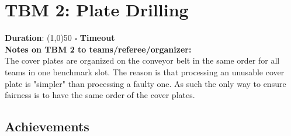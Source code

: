 \section*{TBM 2: Plate Drilling}

\noindent \textbf{Duration}: \line(1,0){50} \hspace{0.5cm} $\square$ \textbf{Timeout} \\

\noindent \textbf{Notes on TBM 2 to teams/referee/organizer:\\}
The cover plates are organized on the conveyor belt in the same order for all teams in one benchmark slot. The reason is that processing an unusable cover plate is "simpler" than processing a faulty one. As such the only way to ensure fairness is to have the same order of the cover plates.

\subsection*{Achievements}
